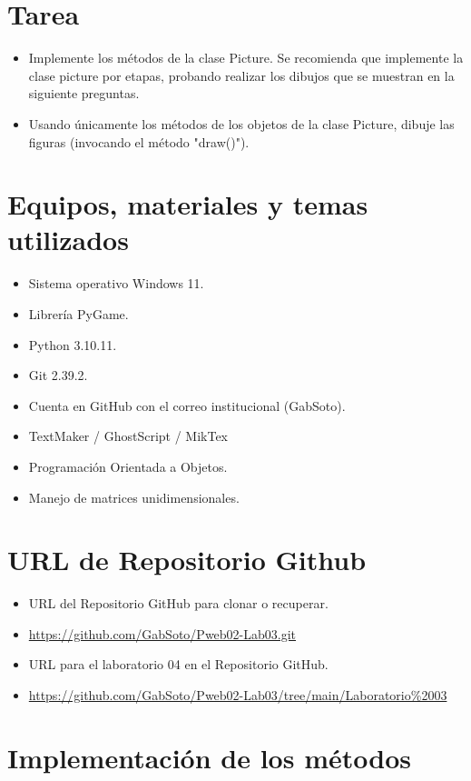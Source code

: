 \documentclass{article}
\begin{document}
	\section{Tarea}
	\begin{itemize}		
		\item Implemente los métodos de la clase Picture. Se recomienda que implemente la clase picture por etapas, probando realizar los dibujos que se muestran en la siguiente preguntas.
		\item Usando únicamente los métodos de los objetos de la clase Picture, dibuje las figuras (invocando el método "draw()").
	\end{itemize}
	
	\section{Equipos, materiales y temas utilizados}
	\begin{itemize}
		\item Sistema operativo Windows 11.
		\item Librería PyGame.
		\item Python 3.10.11.
		\item Git 2.39.2.
		\item Cuenta en GitHub con el correo institucional (GabSoto).
		\item TextMaker / GhostScript / MikTex
		\item Programación Orientada a Objetos.
		\item Manejo de matrices unidimensionales.
	\end{itemize}
	
	\section{URL de Repositorio Github}
	\begin{itemize}
		\item URL del Repositorio GitHub para clonar o recuperar.
		\item \url{https://github.com/GabSoto/Pweb02-Lab03.git}
		\item URL para el laboratorio 04 en el Repositorio GitHub.
		\item \url{https://github.com/GabSoto/Pweb02-Lab03/tree/main/Laboratorio%2003}
	\end{itemize}
	
	\section{Implementación de los métodos}
	
\end{document}
